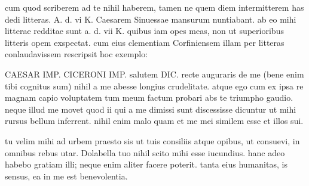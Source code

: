


 cum quod scriberem ad te nihil haberem, tamen ne quem diem intermitterem has dedi litteras. A. d. vi K. Caesarem Sinuessae mansurum nuntiabant. ab eo mihi litterae redditae sunt a. d. vii K. quibus iam opes meas, non ut superioribus litteris opem exspectat. cum eius clementiam Corfiniensem illam per litteras conlaudavissem rescripsit hoc exemplo:

 CAESAR IMP. CICERONI IMP. salutem DIC. recte auguraris de me (bene enim tibi cognitus sum) nihil a me abesse longius crudelitate. atque ego cum ex ipsa re magnam capio voluptatem tum meum factum probari abs te triumpho gaudio. neque illud me movet quod ii qui a me dimissi sunt discessisse dicuntur ut mihi rursus bellum inferrent. nihil enim malo quam et me mei similem esse et illos sui.

 tu velim mihi ad urbem praesto sis ut tuis consiliis atque opibus, ut consuevi, in omnibus rebus utar. Dolabella tuo nihil scito mihi esse iucundius. hanc adeo habebo gratiam illi; neque enim aliter facere poterit. tanta eius humanitas, is sensus, ea in me est benevolentia.
